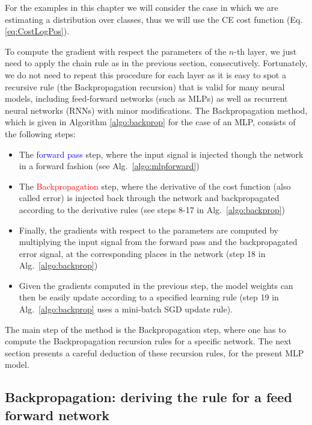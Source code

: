 For the examples in this chapter we will consider the case in which we are
estimating a distribution over classes, thus we will use the CE cost function
(Eq. \ref{eq:CostLogPos}).

To compute the gradient with respect the parameters of the $n$-th layer, we
just need to apply the chain rule as in the previous section, consecutively.
Fortunately, we do not need to repeat this procedure for each layer as it is
easy to spot a recursive rule (the Backpropagation recursion) that is valid
for many neural models, including feed-forward networks (such as MLPs) as well
as recurrent neural networks (RNNs) with minor modifications. The
Backpropagation method, which is given in Algorithm \ref{algo:backprop} for
the case of an MLP, consists of the following steps:

\begin{itemize}
\item The \textcolor{blue}{forward pass} step, where the input signal is injected though the network  in a forward fashion (see Alg.~\ref{algo:mlpforward})
\item The \textcolor{red}{Backpropagation} step, where the derivative of the cost function (also called error) is injected back through the network and backpropagated according to the derivative rules (see steps 8-17 in Alg.~\ref{algo:backprop})
\item Finally, the gradients with respect to the parameters are computed by multiplying the input signal from the forward pass and the backpropagated error signal, at the corresponding places in the network (step 18 in Alg.~\ref{algo:backprop})
\item Given the gradients computed in the previous step, the model weights can then be easily update according to a specified learning rule (step 19 in Alg.~\ref{algo:backprop} uses a mini-batch SGD update rule).
\end{itemize}

The main step of the method is the Backpropagation step, where one has to compute the Backpropagation recursion rules for a specific network.
The next section presents a careful deduction of these recursion rules, for the present MLP model.

\subsection{Backpropagation: deriving the rule for a feed forward network}

